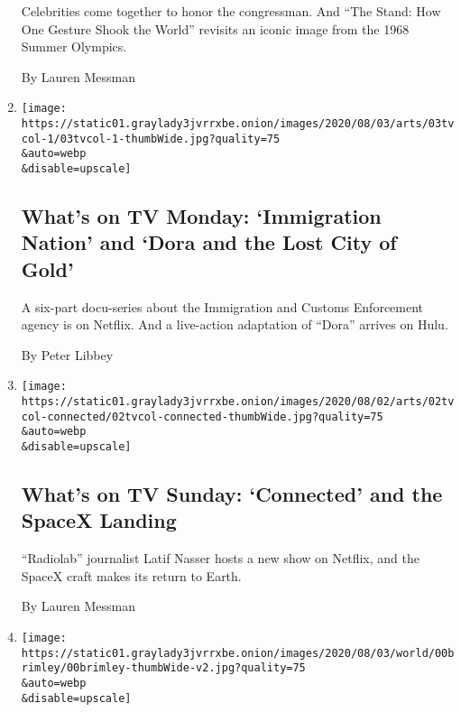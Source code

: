 \begin{enumerate}
  Celebrities come together to honor the congressman. And ``The Stand:
  How One Gesture Shook the World'' revisits an iconic image from the
  1968 Summer Olympics.

  By Lauren Messman
\item
  \href{/2020/08/03/arts/television/whats-on-tv-monday-immigration-nation-and-dora-and-the-lost-city-of-gold.html}{}

  \texttt{[image: https://static01.graylady3jvrrxbe.onion/images/2020/08/03/arts/03tvcol-1/03tvcol-1-thumbWide.jpg?quality=75\\\&auto=webp\\\&disable=upscale]}

  \hypertarget{whats-on-tv-monday-immigration-nation-and-dora-and-the-lost-city-of-gold}{%
  \subsection{What's on TV Monday: `Immigration Nation' and `Dora and
  the Lost City of
  Gold'}\label{whats-on-tv-monday-immigration-nation-and-dora-and-the-lost-city-of-gold}}

  A six-part docu-series about the Immigration and Customs Enforcement
  agency is on Netflix. And a live-action adaptation of ``Dora'' arrives
  on Hulu.

  By Peter Libbey
\item
  \href{/2020/08/02/arts/television/whats-on-tv-sunday-connected-and-the-spacex-landing.html}{}

  \texttt{[image: https://static01.graylady3jvrrxbe.onion/images/2020/08/02/arts/02tvcol-connected/02tvcol-connected-thumbWide.jpg?quality=75\\\&auto=webp\\\&disable=upscale]}

  \hypertarget{whats-on-tv-sunday-connected-and-the-spacex-landing}{%
  \subsection{What's on TV Sunday: `Connected' and the SpaceX
  Landing}\label{whats-on-tv-sunday-connected-and-the-spacex-landing}}

  ``Radiolab'' journalist Latif Nasser hosts a new show on Netflix, and
  the SpaceX craft makes its return to Earth.

  By Lauren Messman
\item
  \href{/2020/08/01/obituaries/wilford-brimley-dead.html}{}

  \texttt{[image: https://static01.graylady3jvrrxbe.onion/images/2020/08/03/world/00brimley/00brimley-thumbWide-v2.jpg?quality=75\\\&auto=webp\\\&disable=upscale]}


\end{enumerate}
